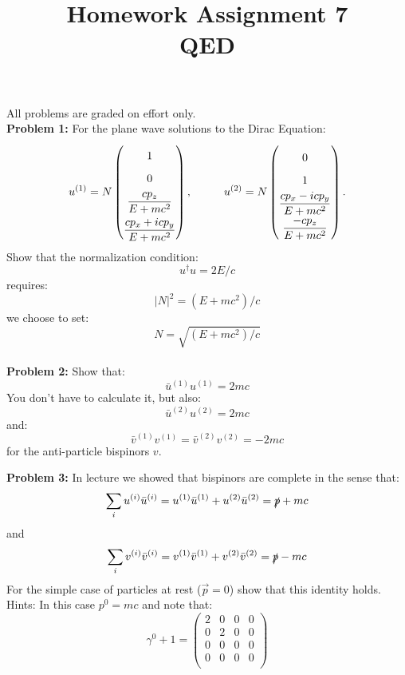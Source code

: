 \documentclass[12pt]{article}
\begin{document}
\title{Homework Assignment 7 \\ QED }

\maketitle

\noindent
All problems are graded on effort only.\\

\noindent
{\bf Problem 1:}  For the plane wave solutions to the Dirac Equation:
$$\def\arraystretch{1.7}
u^{(1)} = N \begin{pmatrix} 1 \\ 0 \\ {\displaystyle \frac{c p_z}{E+mc^2}} \\[5pt] {\displaystyle \frac{c p_x + i c p_y}{E + mc^2}} \end{pmatrix}, 
\hspace{1cm}
u^{(2)} = N \begin{pmatrix} 0 \\ 1 \\ {\displaystyle  \frac{c p_x - i c p_y}{E+mc^2}} \\ {\displaystyle  \frac{-c p_z}{E+mc^2}} \end{pmatrix}.
$$
Show that the normalization condition:
$$u^{\dagger} u = 2E/c$$
requires:
$$|N|^2 = (E + mc^2)/c$$
we choose to set:
$$N = \sqrt{(E+mc^2)/c}$$
~\\[5pt]
    
\noindent
{\bf Problem 2:} Show that:
$$\bar{u}^{(1)} u^{(1)} = 2mc$$
You don't have to calculate it, but also:
$$\bar{u}^{(2)} u^{(2)} = 2mc$$
and:
$$\bar{v}^{(1)} v^{(1)} = \bar{v}^{(2)} v^{(2)} = -2mc$$
for the anti-particle bispinors $v$.\\[5pt]

\newpage

\noindent
{\bf Problem 3:} In lecture we showed that bispinors are complete in the sense that:
$$\sum_i u^{(i)}\bar{u}^{(i)} = u^{(1)}\bar{u}^{(1)} + u^{(2)}\bar{u}^{(2)} = \slashed{p} + mc$$
and
$$\sum_i v^{(i)}\bar{v}^{(i)} = v^{(1)}\bar{v}^{(1)} + v^{(2)}\bar{v}^{(2)} = \slashed{p} - mc$$
For the simple case of particles at rest ($\vec{p} = 0$) show that this identity holds.  Hints:
In this case $p^0 = mc$ and note that:
$$\gamma^0 + 1 = \begin{pmatrix}
  2 & 0 & 0 & 0 \\
  0 & 2 & 0 & 0 \\
  0 & 0 & 0 & 0 \\
  0 & 0 & 0 & 0 \\
\end{pmatrix}$$
~\\[5pt]
\end{document}
